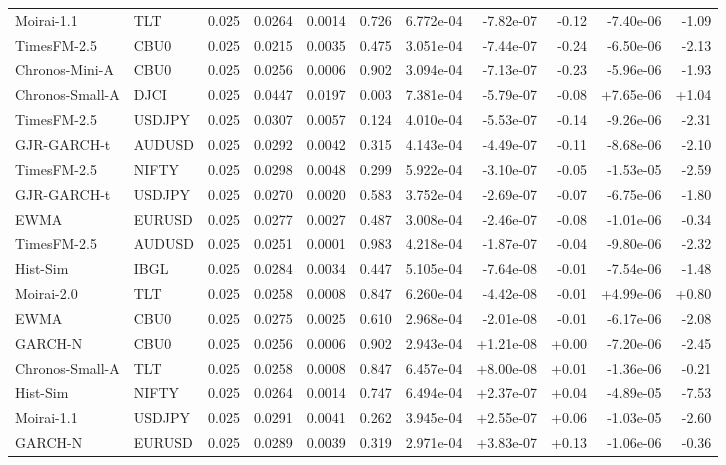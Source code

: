 \begin{tabular}{llrrrrrrrrr}
Moirai-1.1 & TLT & 0.025 & 0.0264 & 0.0014 & 0.726 & 6.772e-04 & -7.82e-07 & -0.12 & -7.40e-06 & -1.09 \\
TimesFM-2.5 & CBU0 & 0.025 & 0.0215 & 0.0035 & 0.475 & 3.051e-04 & -7.44e-07 & -0.24 & -6.50e-06 & -2.13 \\
Chronos-Mini-A & CBU0 & 0.025 & 0.0256 & 0.0006 & 0.902 & 3.094e-04 & -7.13e-07 & -0.23 & -5.96e-06 & -1.93 \\
Chronos-Small-A & DJCI & 0.025 & 0.0447 & 0.0197 & 0.003 & 7.381e-04 & -5.79e-07 & -0.08 & +7.65e-06 & +1.04 \\
TimesFM-2.5 & USDJPY & 0.025 & 0.0307 & 0.0057 & 0.124 & 4.010e-04 & -5.53e-07 & -0.14 & -9.26e-06 & -2.31 \\
GJR-GARCH-t & AUDUSD & 0.025 & 0.0292 & 0.0042 & 0.315 & 4.143e-04 & -4.49e-07 & -0.11 & -8.68e-06 & -2.10 \\
TimesFM-2.5 & NIFTY & 0.025 & 0.0298 & 0.0048 & 0.299 & 5.922e-04 & -3.10e-07 & -0.05 & -1.53e-05 & -2.59 \\
GJR-GARCH-t & USDJPY & 0.025 & 0.0270 & 0.0020 & 0.583 & 3.752e-04 & -2.69e-07 & -0.07 & -6.75e-06 & -1.80 \\
EWMA & EURUSD & 0.025 & 0.0277 & 0.0027 & 0.487 & 3.008e-04 & -2.46e-07 & -0.08 & -1.01e-06 & -0.34 \\
TimesFM-2.5 & AUDUSD & 0.025 & 0.0251 & 0.0001 & 0.983 & 4.218e-04 & -1.87e-07 & -0.04 & -9.80e-06 & -2.32 \\
Hist-Sim & IBGL & 0.025 & 0.0284 & 0.0034 & 0.447 & 5.105e-04 & -7.64e-08 & -0.01 & -7.54e-06 & -1.48 \\
Moirai-2.0 & TLT & 0.025 & 0.0258 & 0.0008 & 0.847 & 6.260e-04 & -4.42e-08 & -0.01 & +4.99e-06 & +0.80 \\
EWMA & CBU0 & 0.025 & 0.0275 & 0.0025 & 0.610 & 2.968e-04 & -2.01e-08 & -0.01 & -6.17e-06 & -2.08 \\
GARCH-N & CBU0 & 0.025 & 0.0256 & 0.0006 & 0.902 & 2.943e-04 & +1.21e-08 & +0.00 & -7.20e-06 & -2.45 \\
Chronos-Small-A & TLT & 0.025 & 0.0258 & 0.0008 & 0.847 & 6.457e-04 & +8.00e-08 & +0.01 & -1.36e-06 & -0.21 \\
Hist-Sim & NIFTY & 0.025 & 0.0264 & 0.0014 & 0.747 & 6.494e-04 & +2.37e-07 & +0.04 & -4.89e-05 & -7.53 \\
Moirai-1.1 & USDJPY & 0.025 & 0.0291 & 0.0041 & 0.262 & 3.945e-04 & +2.55e-07 & +0.06 & -1.03e-05 & -2.60 \\
GARCH-N & EURUSD & 0.025 & 0.0289 & 0.0039 & 0.319 & 2.971e-04 & +3.83e-07 & +0.13 & -1.06e-06 & -0.36 \\

\end{tabular}

